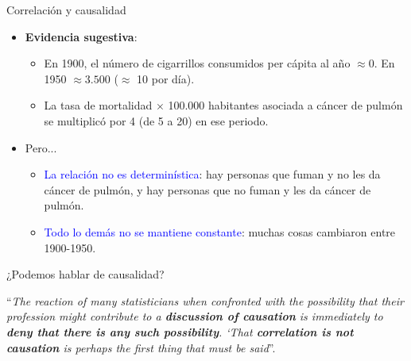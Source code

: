 \documentclass[10pt, xcolor=dvipsnames]{beamer}
\begin{document}
\begin{frame}{Correlación y causalidad}
\begin{itemize}
    \item \textbf{Evidencia sugestiva}:
    \begin{itemize}
        \item En 1900, el número de cigarrillos consumidos per cápita al año $\approx 0$. En 1950 $\approx 3.500$ ($\approx$ 10 por día).
        \item La tasa de mortalidad $\times$ 100.000 habitantes asociada a cáncer de pulmón se multiplicó por 4 (de 5 a 20) en ese periodo. \vspace{0.1cm}	
    \end{itemize}
    \item Pero...%
    \begin{itemize}
        \item \textcolor{blue}{La relación no es determinística}: hay personas que fuman y no les da cáncer de pulmón, y hay personas que no fuman y les da cáncer de pulmón.%
        \item \textcolor{blue}{Todo lo demás no se mantiene constante}: muchas cosas cambiaron entre 1900-1950.	 
    \end{itemize} 
\end{itemize}
\end{frame}


\begin{frame}{¿Podemos hablar de causalidad?}
    \begin{tcolorbox}[colback=gray!10, title=\citet{Holand86}, breakable]
        ``\textit{The reaction of many statisticians when confronted with the possibility that their profession might contribute to a \textbf{discussion of causation} is immediately to \textbf{deny that there is any such possibility}. `That \textbf{correlation is not causation} is perhaps the first thing that must be said}''.
    \end{tcolorbox}
\end{frame}
\end{document}
